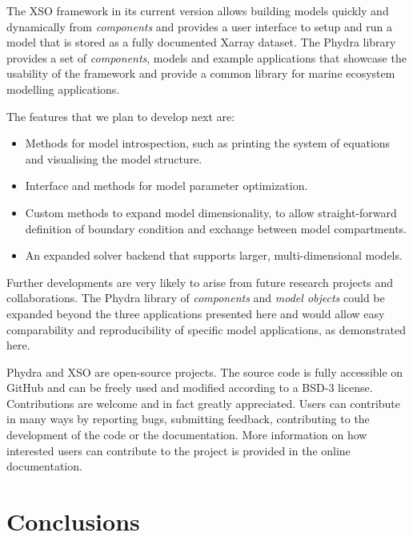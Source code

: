 \documentclass[journal abbreviation, manuscript]{copernicus}
\begin{document}
The XSO framework in its current version allows building models quickly and dynamically from \textit{components} and provides a user interface to setup and run a model that is stored as a fully documented Xarray dataset. The Phydra library provides a set of \textit{components}, models and example applications that showcase the usability of the framework and provide a common library for marine ecosystem modelling applications. 

The features that we plan to develop next are: 

\begin{itemize}
    \item Methods for model introspection, such as printing the system of equations and visualising the model structure.
    \item Interface and methods for model parameter optimization.
    \item Custom methods to expand model dimensionality, to allow straight-forward definition of boundary condition and exchange between model compartments.
    \item An expanded solver backend that supports larger, multi-dimensional models.
\end{itemize}

Further developments are very likely to arise from future research projects and collaborations. The Phydra library of \textit{components} and \textit{model objects} could be expanded beyond the three applications presented here and would allow easy comparability and reproducibility of specific model applications, as demonstrated here.

Phydra and XSO are open-source projects. The source code is fully accessible on GitHub and can be freely used and modified according to a BSD-3 license. Contributions are welcome and in fact greatly appreciated. Users can contribute in many ways by reporting bugs, submitting feedback, contributing to the development of the code or the documentation. More information on how interested users can contribute to the project is provided in the online documentation.


\section{Conclusions}
\end{document}
